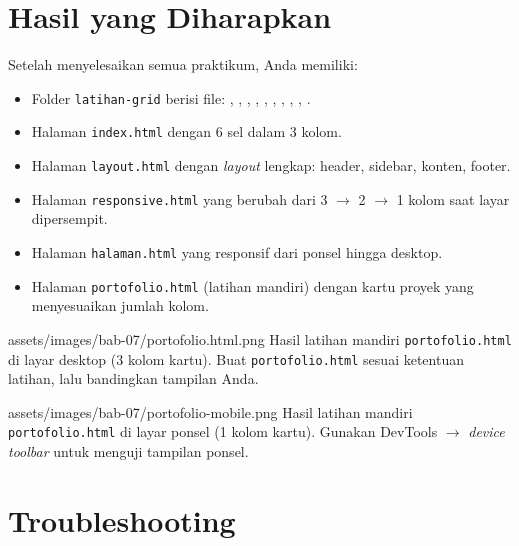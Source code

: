 \section{Hasil yang Diharapkan}
\label{sec:grid-hasil}

Setelah menyelesaikan semua praktikum, Anda memiliki:
\begin{itemize}
  \item Folder \texttt{latihan-grid} berisi file: , , , , , , , , , .
  \item Halaman \texttt{index.html} dengan 6 sel dalam 3 kolom.
  \item Halaman \texttt{layout.html} dengan \emph{layout} lengkap: header, sidebar, konten, footer.
  \item Halaman \texttt{responsive.html} yang berubah dari 3 $\rightarrow$ 2 $\rightarrow$ 1 kolom saat layar dipersempit.
  \item Halaman \texttt{halaman.html} yang responsif dari ponsel hingga desktop.
  \item Halaman \texttt{portofolio.html} (latihan mandiri) dengan kartu proyek yang menyesuaikan jumlah kolom.
\end{itemize}

\begin{tangkapanlayar}
  {assets/images/bab-07/portofolio.html.png}
  {Hasil latihan mandiri \texttt{portofolio.html} di layar desktop (3 kolom kartu).}
  {Buat \texttt{portofolio.html} sesuai ketentuan latihan, lalu bandingkan tampilan Anda.}
\end{tangkapanlayar}

\begin{tangkapanlayar}
  {assets/images/bab-07/portofolio-mobile.png}
  {Hasil latihan mandiri \texttt{portofolio.html} di layar ponsel (1 kolom kartu).}
  {Gunakan DevTools $\rightarrow$ \emph{device toolbar} untuk menguji tampilan ponsel.}
\end{tangkapanlayar}

\section{Troubleshooting}
\label{sec:grid-trouble}

